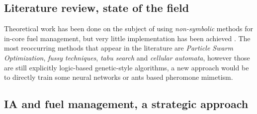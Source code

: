 \subsection{Literature review, state of the field}

\noindent Theoretical work has been done on the subject of using \textit{non-symbolic} methods for in-core fuel management, but very little implementation has been achieved \cite{anderson19}. The most reoccurring methods that appear in the literature are \textit{Particle Swarm Optimization}, \textit{fussy techniques}, \textit{tabu search} and \textit{cellular automata}, however those are still explicitly logic-based genetic-style algorithms, a new approach would be to directly train some neural networks or ants based pheromone mimetism. 
\subsection{IA and fuel management, a strategic approach}


